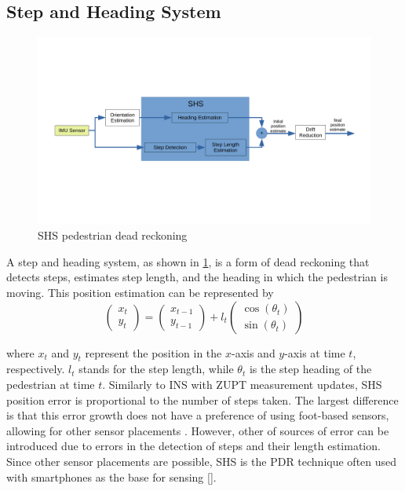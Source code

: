 \subsection{Step and Heading System}
\label{sec:rw-SHS}
\begin{figure}[H]
	\centering
	\includegraphics[trim=40 120 180 80, clip,width=\linewidth]{images/shs_diagram}
	\caption{\ac{SHS} pedestrian dead reckoning}
	\label{fig:shs_diagram}
\end{figure}
A step and heading system, as shown in \cref{fig:shs_diagram}, is a form of dead reckoning that detects steps, estimates step length, and the heading in which the pedestrian is moving. This position estimation can be represented by \cite{MunozDiaz2019}
\begin{equation}
	\label{eq:SHS_dynamic_model}
	\left(\begin{array}{l}
		x_t \\
		y_t
	\end{array}\right) 
	=
	\left(\begin{array}{l}
		x_{t-1} \\
		y_{t-1}
	\end{array}\right) 
	+l_{t} \left(\begin{array}{l}
		\cos \left(\theta_{t}\right) \\
		\sin \left(\theta_{t}\right)
	\end{array}\right)
\end{equation}

where $x_{t}$  and  $y_{t}$ represent the position in the $x$-axis and $y$-axis at time  $t$, respectively. $l_{t}$ stands for the step length, while $\theta_{t}$ is the step heading of the pedestrian at time $t$.
Similarly to INS with ZUPT measurement updates, SHS position error is proportional to the number of steps taken. The largest difference is that this error growth does not have a preference of using foot-based sensors, allowing for other sensor placements \cite{Diez2018b}. However, other of sources of error can be introduced due to errors in the detection of steps and their length estimation.  Since other sensor placements are possible, SHS is the PDR technique often used with smartphones as the base for sensing [\qn]. 

